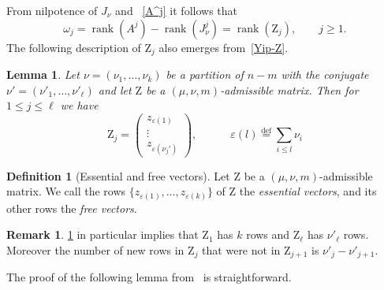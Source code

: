 \documentclass[12pt,a4paper,reqno]{amsart}
\theoremstyle{plain}
\newtheorem{lemma}[theorem]{Lemma}
\theoremstyle{definition}
\newtheorem{definition}[theorem]{Definition}
\newtheorem{remark}[theorem]{Remark}
\newcommand{\defin}{\overset{\mathrm{def}}{=}}
\newcommand{\1}{\mathds{1}}
\newcommand{\Z}{\mathrm{Z}}
\DeclareMathOperator{\rk}{rank}
\begin{document}
From nilpotence of $J_\nu$ and ~\cref{A^j} it follows that
\begin{equation}
\label{eqq:admi}\omega_j=\rk(A^j)-\rk(J_{\nu}^j)=\rk(\Z_j),\qquad j\geq 1.
\end{equation}
The following description of $\Z_j$ also emerges from~\cref{Yip-Z}. 
\begin{lemma}\label{Z_j-description} Let $\nu=(\nu_1,\dots,\nu_k)$ be a partition of $n-m$ with the conjugate $\nu'=(\nu'_1,\dots,\nu'_\ell)$ and let $\Z$ be a $(\mu,\nu,m)$-admissible matrix. Then for $1\leq j\leq \ell$ we have
\begin{equation}\label{Z_j-matrix}
    \Z_j=\begin{pmatrix}
    z_{\varepsilon(1)}\\ \vdots\\ z_{\varepsilon(\nu_j')}
\end{pmatrix}, \qquad\quad  \varepsilon(l)\defin\sum_{i\leq l}\nu_i
\end{equation}
\end{lemma}
\begin{definition}[Essential and free vectors]
\label{dfn-free-adm}
Let $\Z$ be a $(\mu,\nu,m)$-admissible matrix. We call the rows 
$\{z_{\varepsilon(1)},\ldots,
z_{\varepsilon(k)}\}$ of $\Z$ the \emph{essential vectors}, and its other rows the  \emph{free vectors}.
\end{definition}

\begin{remark}\label{new-entires}
    \cref{Z_j-description} in particular implies that $\Z_1$ has $k$ rows and $\Z_\ell$ has $\nu'_\ell$ rows. Moreover the number of new rows in $\Z_j$ that were not in $\Z_{j+1}$ is $\nu'_j-\nu'_{j+1}$.
\end{remark}




The proof of the following lemma 
from~\cite[Lemma 2]{Yip}
is straightforward. 
\end{document}
